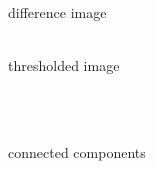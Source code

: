 \documentclass[12pt,a4paper,oneside,openright]{book}
\begin{document}
\begin{CJK}{UTF8}{}
\begin{figure}[htbp]
\begin{center}
\begin{minipage}[t]{.32\textwidth}
\begin{center}
        difference image
      \end{center}
    \end{minipage}
    \begin{minipage}[t]{.32\textwidth}
      \begin{center}
        \\
        thresholded image
      \end{center}
    \end{minipage}\medskip\\
    \begin{minipage}[t]{.32\textwidth}
      \begin{center}
        \\
        connected components
      \end{center}
    \end{minipage}
    \begin{minipage}[t]{.32\textwidth}
      \begin{center}
        \\

\end{center}
\end{minipage}
\end{center}
\end{figure}
\end{CJK}
\end{document}
